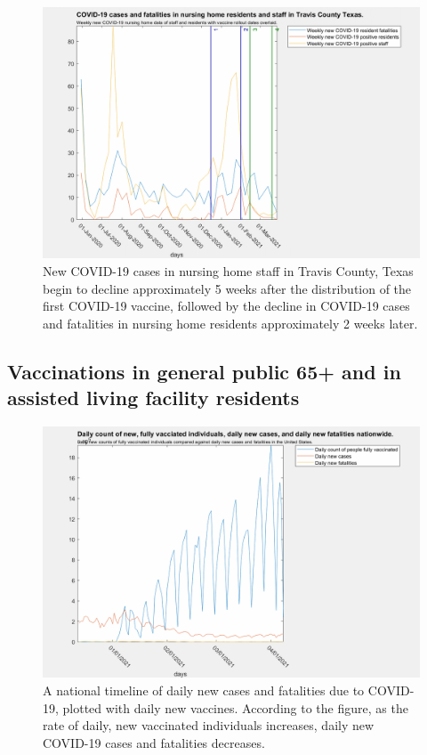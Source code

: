 \documentclass[twoside]{article}
\begin{document}
\begin{multicols}{2}
\begin{figure}[H]
	\includegraphics[width=\linewidth]{images/travis_nursing_home_with_vaccine.png}
	\caption{New COVID-19 cases in nursing home staff in Travis County, Texas begin to decline approximately 5 weeks after the distribution of the first COVID-19 vaccine, followed by the decline in COVID-19 cases and fatalities in nursing home residents approximately 2 weeks later. }
	\label{fig:images/travis_nursing_home_with_vaccineLabel}
\end{figure}

\subsection{Vaccinations in general public 65+ and in assisted living facility residents}

\begin{figure}[H]
	\includegraphics[width=\linewidth]{images/nationwide_fully_vaccinated.png}
	\caption{A national timeline of daily new cases and fatalities due to COVID-19, plotted with daily new vaccines. According to the figure, as the rate of daily, new vaccinated individuals increases, daily new COVID-19 cases and fatalities decreases.}
	\label{fig:images/nationwide_fully_vaccinatedLabel}
\end{figure}


\end{multicols}
\end{document}

